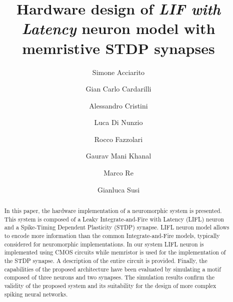 \documentclass[review]{elsarticle}
\begin{document}
\begin{frontmatter}

\title{Hardware design of \emph{LIF with Latency} neuron model with memristive STDP synapses}

\author[label1]{Simone Acciarito}
\author[label1]{Gian Carlo Cardarilli} 
\author[label1]{Alessandro Cristini}
\author[label1]{Luca Di Nunzio}
\author[label1]{Rocco Fazzolari} 
\author[label1]{Gaurav Mani Khanal}
\author[label1]{Marco Re}
\author[label1,label3]{Gianluca Susi}

\address[label1]{Department of Electronics Engineering. University of Rome ``Tor Vergata'', Rome, Italy}
\address[label3]{Laboratory of Cognitive and Computational Neuroscience (UCM-UPM), Center for Biomedical Technology. Technical University of Madrid, Madrid, Spain}



\begin{abstract}

In this paper, the hardware implementation of a neuromorphic system is presented. This system is composed of a Leaky Integrate-and-Fire with Latency (LIFL) neuron and a Spike-Timing Dependent Plasticity (STDP) synapse. LIFL neuron model allows to encode more information than the common Integrate-and-Fire models, typically considered for neuromorphic implementations. In our system LIFL neuron is implemented using CMOS circuits while memristor is used for the implementation of the STDP synapse.
A description of the entire circuit is provided.
Finally, the capabilities of the proposed architecture have been evaluated by simulating a motif composed of three neurons and two synapses.
The simulation results confirm the validity of the proposed system and its suitability for the design of  more complex spiking neural networks.



\end{abstract}


\end{frontmatter}
\end{document}
